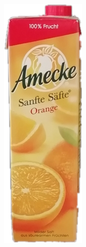 \begin{figure}[htb]
\begin{minipage}[c]{0.08\textwidth}
\includegraphics[width=\textwidth]{Sources/Bild2.png}

\end{minipage}
\end{figure}
